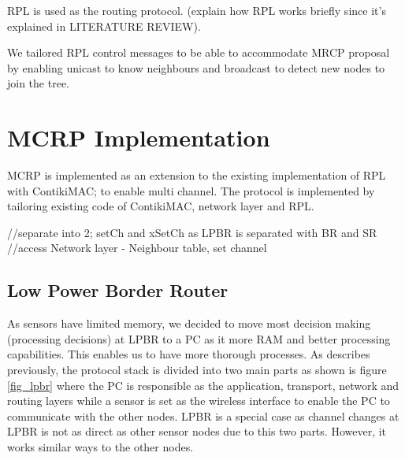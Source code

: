 RPL is used as the routing protocol. (explain how RPL works briefly since it's explained in LITERATURE REVIEW).

We tailored RPL control messages to be able to accommodate MRCP proposal by enabling unicast to know neighbours and broadcast to detect new nodes to join the tree.  


\section{MCRP Implementation}
MCRP is implemented as an extension to the existing implementation of RPL with ContikiMAC; to enable multi channel.
The protocol is implemented by tailoring existing code of ContikiMAC, network layer and RPL.

//separate into 2; setCh and xSetCh as LPBR is separated with BR and SR
//access Network layer - Neighbour table, set channel

\subsection{Low Power Border Router}
As sensors have limited memory, we decided to move most decision making (processing decisions) at LPBR to a PC as it more RAM and better processing capabilities. This enables us to have more thorough processes. As describes previously, the protocol stack is divided into two main parts as shown is figure \ref{fig_lpbr} where the PC is responsible as the application, transport, network and routing layers while a sensor is set as the wireless interface to enable the PC to communicate with the other nodes. LPBR is a special case as channel changes at LPBR is not as direct as other sensor nodes due to this two parts. However, it works similar ways to the other nodes.

